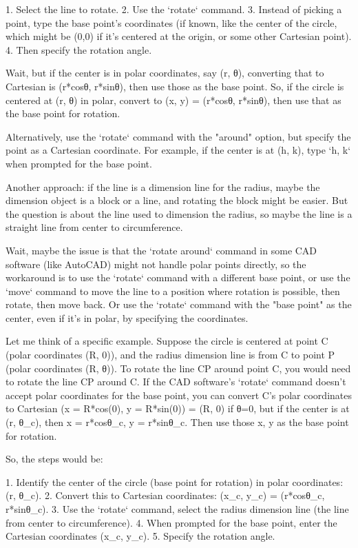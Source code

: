 1. Select the line to rotate.
2. Use the `rotate` command.
3. Instead of picking a point, type the base point's coordinates (if known, like the center of the circle, which might be (0,0) if it's centered at the origin, or some other Cartesian point).
4. Then specify the rotation angle.

Wait, but if the center is in polar coordinates, say (r, θ), converting that to Cartesian is (r*cosθ, r*sinθ), then use those as the base point. So, if the circle is centered at (r, θ) in polar, convert to (x, y) = (r*cosθ, r*sinθ), then use that as the base point for rotation. 

Alternatively, use the `rotate` command with the "around" option, but specify the point as a Cartesian coordinate. For example, if the center is at (h, k), type `h, k` when prompted for the base point. 

Another approach: if the line is a dimension line for the radius, maybe the dimension object is a block or a line, and rotating the block might be easier. But the question is about the line used to dimension the radius, so maybe the line is a straight line from center to circumference. 

Wait, maybe the issue is that the `rotate around` command in some CAD software (like AutoCAD) might not handle polar points directly, so the workaround is to use the `rotate` command with a different base point, or use the `move` command to move the line to a position where rotation is possible, then rotate, then move back. Or use the `rotate` command with the "base point" as the center, even if it's in polar, by specifying the coordinates. 

Let me think of a specific example. Suppose the circle is centered at point C (polar coordinates (R, 0)), and the radius dimension line is from C to point P (polar coordinates (R, θ)). To rotate the line CP around point C, you would need to rotate the line CP around C. If the CAD software's `rotate` command doesn't accept polar coordinates for the base point, you can convert C's polar coordinates to Cartesian (x = R*cos(0), y = R*sin(0)) = (R, 0) if θ=0, but if the center is at (r, θ_c), then x = r*cosθ_c, y = r*sinθ_c. Then use those x, y as the base point for rotation. 

So, the steps would be:

1. Identify the center of the circle (base point for rotation) in polar coordinates: (r, θ_c).
2. Convert this to Cartesian coordinates: (x_c, y_c) = (r*cosθ_c, r*sinθ_c).
3. Use the `rotate` command, select the radius dimension line (the line from center to circumference).
4. When prompted for the base point, enter the Cartesian coordinates (x_c, y_c).
5. Specify the rotation angle.

